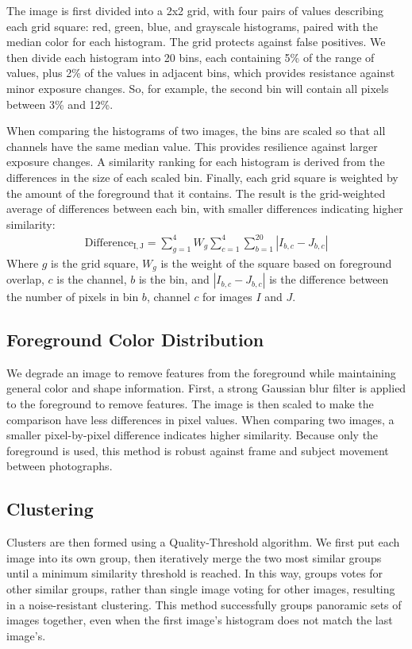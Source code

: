 \documentclass{sig-alternate}
\begin{document}
The image is first divided into a 2x2 grid, with four pairs of values describing each grid square: red, green, blue, and grayscale histograms, paired with the median color for each histogram. The grid protects against false positives. We then divide each histogram into 20 bins, each containing 5\% of the range of values, plus 2\% of the values in adjacent bins, which provides resistance against minor exposure changes. So, for example, the second bin will contain all pixels between 3\% and 12\%.

When comparing the histograms of two images, the bins are scaled so that all channels have the same median value. This provides resilience against larger exposure changes. A similarity ranking for each histogram is derived from the differences in the size of each scaled bin. Finally, each grid square is weighted by the amount of the foreground that it contains. The result is the grid-weighted average of differences between each bin, with smaller differences indicating higher similarity:
\begin{eqnarray}
\mathrm{Difference_{I,J}}=\displaystyle\sum\limits_{g=1}^4W_g\sum\limits_{c=1}^4\sum\limits_{b=1}^{20} |I_{b,c} - J_{b,c}|
\end{eqnarray}
Where \(g\) is the grid square, \(W_g\) is the weight of the square based on foreground overlap, \(c\) is the channel, \(b\) is the bin, and \(|I_{b,c}-J_{b,c}|\) is the difference between the number of pixels in bin \(b\), channel \(c\) for images \(I\) and \(J\).

\subsection{Foreground Color Distribution}
We degrade an image to remove features from the foreground while maintaining general color and shape information. First, a strong Gaussian blur filter is applied to the foreground to remove features. The image is then scaled to make the comparison have less differences in pixel values. When comparing two images, a smaller pixel-by-pixel difference indicates higher similarity. Because only the foreground is used, this method is robust against frame and subject movement between photographs.

\subsection{Clustering}
Clusters are then formed using a Quality-Threshold algorithm. We first put each image into its own group, then iteratively merge the two most similar groups until a minimum similarity threshold is reached. In this way, groups votes for other similar groups, rather than single image voting for other images, resulting in a noise-resistant clustering. This method successfully groups panoramic sets of images together, even when the first image's histogram does not match the last image's. %
\end{document}

